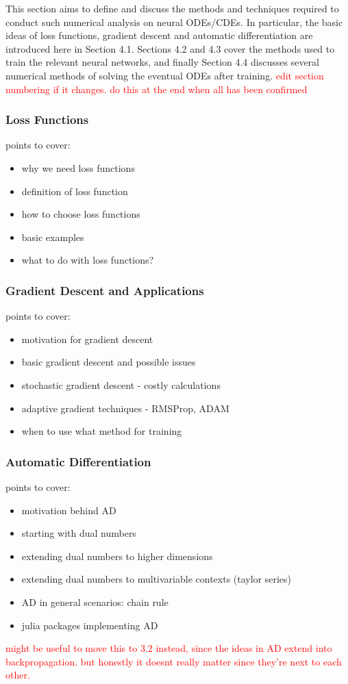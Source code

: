 \documentclass[a4paper,11pt, titlepage]{article}
\theoremstyle{definition}
\theoremstyle{plain}
\theoremstyle{remark}
\begin{document}
This section aims to define and discuss the methods and techniques required to conduct such numerical analysis on neural ODEs/CDEs. In particular, the basic ideas of loss functions, gradient descent and automatic differentiation are introduced here in Section 4.1. Sections 4.2 and 4.3 cover the methods used to train the relevant neural networks, and finally Section 4.4 discusses several numerical methods of solving the eventual ODEs after training. \textcolor{red}{edit section numbering if it changes. do this at the end when all has been confirmed}

\subsubsection{Loss Functions}
points to cover:
\begin{itemize}
    \item why we need loss functions
    \item definition of loss function
    \item how to choose loss functions
    \item basic examples
    \item what to do with loss functions?
\end{itemize}

\subsubsection{Gradient Descent and Applications}
points to cover:
\begin{itemize}
    \item motivation for gradient descent
    \item basic gradient descent and possible issues
    \item stochastic gradient descent - costly calculations
    \item adaptive gradient techniques - RMSProp, ADAM
    \item when to use what method for training
\end{itemize}

\subsubsection{Automatic Differentiation}
points to cover:
\begin{itemize}
    \item motivation behind AD
    \item starting with dual numbers
    \item extending dual numbers to higher dimensions
    \item extending dual numbers to multivariable contexts (taylor series)
    \item AD in general scenarios: chain rule
    \item julia packages implementing AD
\end{itemize}
\textcolor{red}{might be useful to move this to 3.2 instead, since the ideas in AD extend into backpropagation. but honestly it doesnt really matter since they're next to each other.}
\end{document}
